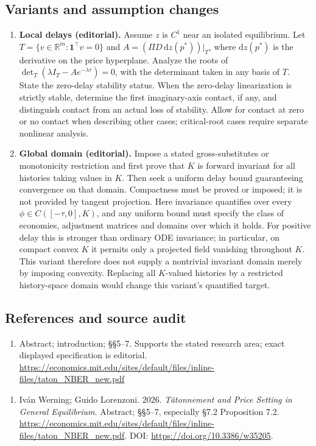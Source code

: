 \documentclass[11pt,a4paper]{article}
\begin{document}
\subsection*{Variants and assumption changes}
\begin{enumerate}
\item \textbf{Local delays (editorial).} Assume \(z\) is \(C^1\) near an isolated equilibrium. Let \(T=\{v\in\mathbb R^m:\mathbf1^\top v=0\}\) and \(A=(\Pi D\,\mathrm dz(p^*))|_T\), where \(\mathrm dz(p^*)\) is the derivative on the price hyperplane. Analyze the roots of \(\det_T(\lambda I_T-Ae^{-\lambda\tau})=0\), with the determinant taken in any basis of \(T\). State the zero-delay stability status. When the zero-delay linearization is strictly stable, determine the first imaginary-axis contact, if any, and distinguish contact from an actual loss of stability. Allow for contact at zero or no contact when describing other cases; critical-root cases require separate nonlinear analysis.
\item \textbf{Global domain (editorial).} Impose a stated gross-substitutes or monotonicity restriction and first prove that \(K\) is forward invariant for all histories taking values in \(K\). Then seek a uniform delay bound guaranteeing convergence on that domain. Compactness must be proved or imposed; it is not provided by tangent projection. Here invariance quantifies over every \(\phi\in C([-\tau,0],K)\), and any uniform bound must specify the class of economies, adjustment matrices and domains over which it holds. For positive delay this is stronger than ordinary ODE invariance; in particular, on compact convex \(K\) it permits only a projected field vanishing throughout \(K\). This variant therefore does not supply a nontrivial invariant domain merely by imposing convexity. Replacing all \(K\)-valued histories by a restricted history-space domain would change this variant's quantified target.
\end{enumerate}
\subsection*{References and source audit}
\begin{enumerate}
\item Abstract; introduction; §§5–7. Supports the stated research area; exact displayed specification is editorial. \url{https://economics.mit.edu/sites/default/files/inline-files/taton_NBER_new.pdf}
\end{enumerate}
\begin{enumerate}\raggedright
\item\hypertarget{definitions:source:30007552:1}{} Iván Werning; Guido Lorenzoni. 2026. \emph{Tâtonnement and Price Setting in General Equilibrium}. Abstract; §§5–7, especially §7.2 Proposition 7.2.
\url{https://economics.mit.edu/sites/default/files/inline-files/taton_NBER_new.pdf}.
DOI: \url{https://doi.org/10.3386/w35205}.
\end{enumerate}
\end{document}
